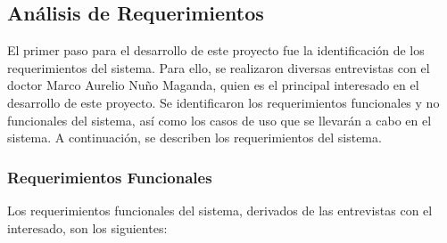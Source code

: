 \subsection{Análisis de Requerimientos}
El primer paso para el desarrollo de este proyecto fue la identificación de los requerimientos del sistema. Para ello, se realizaron diversas entrevistas con el doctor Marco Aurelio Nuño Maganda, quien es el principal interesado en el desarrollo de este proyecto. Se identificaron los requerimientos funcionales y no funcionales del sistema, así como los casos de uso que se llevarán a cabo en el sistema. A continuación, se describen los requerimientos del sistema. 

\subsubsection{Requerimientos Funcionales}
Los requerimientos funcionales del sistema, derivados de las entrevistas con el interesado, son los siguientes:

